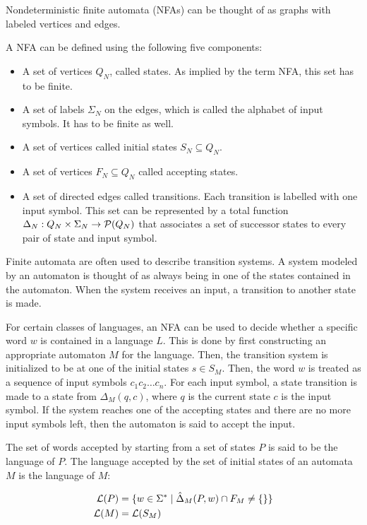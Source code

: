 Nondeterministic finite automata (NFAs) can be thought of
as graphs with labeled vertices and edges.

\begin{definition}
    A NFA can be defined using the following five components:

    \begin{itemize}
        \item A set of vertices $Q_N$, called states.
            As implied by the term NFA, this set has to be finite.
        \item A set of labels $\Sigma_N$ on the edges,
            which is called the alphabet of input symbols.
            It has to be finite as well.
        \item A set of vertices called initial states $S_N \subseteq Q_N$.
        \item A set of vertices $F_N \subseteq Q_N$ called accepting states.
        \item A set of directed edges called transitions.
            Each transition is labelled with one input symbol.
            This set can be represented by a total function
            $\Delta_N : Q_N \times \Sigma_N \rightarrow \mathcal{P}(Q_N)$
            that associates a set of successor states to every pair of state and input symbol.
    \end{itemize}
\end{definition}

Finite automata are often used to describe transition systems.
A system modeled by an automaton is thought of as
always being in one of the states contained in the automaton.
When the system receives an input, a transition to another state is made.

For certain classes of languages, an NFA can be used to decide
whether a specific word $w$ is contained in a language $L$.
This is done by first constructing an appropriate automaton $M$ for the language.
Then, the transition system is initialized to be at one of the initial states $s \in S_M$.
Then, the word $w$ is treated as a sequence of input symbols $c_1 c_2 \ldots c_n$.
For each input symbol, a state transition is made to a state from $\Delta_{M}(q, c)$,
where $q$ is the current state $c$ is the input symbol.
If the system reaches one of the accepting states and there are no more input symbols left,
then the automaton is said to accept the input.

\begin{definition}
    The set of words accepted by starting from a set of states $P$
    is said to be the language of $P$.
    The language accepted by the set of initial states of an automata $M$ is the language of $M$:

    \begin{align}
        \mathcal{L}(P) &= \{ w \in \Sigma^\ast \mid \hat\Delta_M(P, w) \cap F_M \neq \{ \} \}\\
        \mathcal{L}(M) &= \mathcal{L}(S_M)
    \end{align}
\end{definition}

